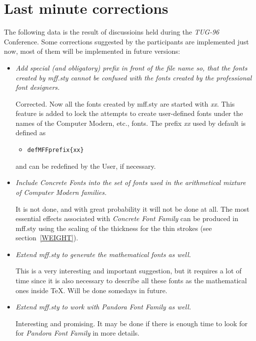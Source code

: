 \section{Last minute corrections\label{MORE}}

The following data is the result of discussioins
held during the {\sl TUG-96} Conference.
Some corrections suggested by the participants
are implemented just now, most of them will be
implemented in future versions:
\begin{itemize}
\item {\em Add special (and obligatory) prefix in front of
      the file name so, that the fonts created
      by {\sc mff.sty} cannot be confused with the fonts
      created by the professional font designers.}

      Corrected. Now all the fonts created by {\sc mff.sty} are
      started with {\em xx}. This feature is added to lock the
      attempts to create user-defined fonts under the names of
      the Computer Modern, etc., fonts. The prefix {\em xx}
      used by default is defined as
      \begin{itemize}
      \item[] \tt\bs{}def\bs{}MFFprefix\{xx\}
      \end{itemize}
      and can be redefined by the User, if necessary.

\item {\em Include {\sl Concrete Fonts} into the set of fonts
      used in the arithmetical mixture of Computer Modern
      families.}

      It is not done, and with great probability it will not be done
      at all. The most essential effects associated with
      {\em Concrete Font Family} can be produced in {\sc mff.sty}
      using the scaling of the thickness for
      the thin strokes (see section~\ref{WEIGHT}).

\item {\em Extend {\sc mff.sty} to generate the mathematical fonts as well.}

      This is a very interesting and important suggestion,
      but it requires a lot of time since it is also necessary
      to describe all these fonts as the mathematical ones
      inside \TeX. Will be done somedays in future.

\item {\em Extend {\sc mff.sty} to work with {\sl Pandora Font Family}
      as well.}

      Interesting and promising. It may be done if there
      is enough time to look for for {\sl Pandora Font Family}
      in more details.


\end{itemize}
